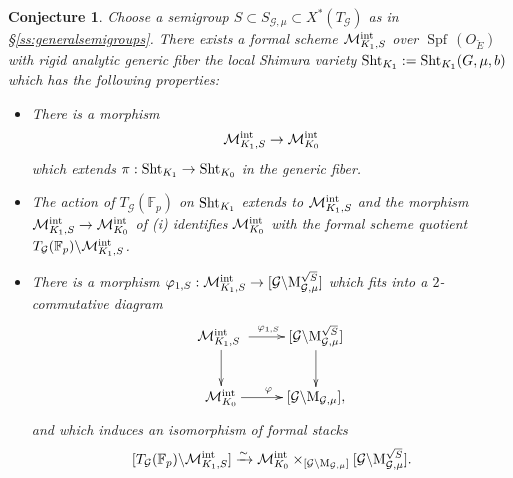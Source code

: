 \documentclass[reqno, 10pt]{amsart}
\makeatletter
\newcommand{\BF}{\ensuremath{\mathbb {F}}\xspace}
\newcommand{\CG}{\ensuremath{\mathcal {G}}\xspace}
\newcommand{\CM}{\ensuremath{\mathcal {M}}\xspace}
\DeclareMathOperator{\Spf}{Spf\,}
\newcommand{\bs}{\backslash}
\newtheorem {conjecture}[subsubsection]{Conjecture}
\theoremstyle{definition}
\numberwithin{equation}{subsection}
\numberwithin{subsubsection}{subsection}
\renewcommand{\to}{%
   \ifbool{@display}{\longrightarrow}{\rightarrow}%
   }
\newcommand{\br}{\breve}
\newcommand{\Mloc}{{\rm M}}
\makeatother
\begin{document}
\begin{conjecture}\label{localconj} Choose a semigroup $S\subset S_{\CG,\mu}\subset X^*(T_\CG)$ as in \S \ref{ss:generalsemigroups}.  
 There exists a formal scheme $\CM^{\rm int}_{K_1, S}$ over $\Spf(O_{\br E})$ with rigid analytic generic fiber  the local Shimura variety 
 ${\rm Sht}_{K_1}:={\rm Sht}_{K_1}(G,\mu, b)$ which has the following properties:
 
 \begin{itemize}
\item[i)] There is a morphism 
\[
\CM^{\rm int}_{K_1, S}\to \mathcal \CM^{\rm int}_{K_0}
\] 
which extends $\pi: {\rm Sht}_{K_1} \to {\rm Sht}_{K_0} $ in the generic fiber.
 
 \item[ii)] The action of $T_\CG(\BF_p)$ on ${\rm Sht}_{K_1}$ extends to $\CM^{\rm int}_{K_1, S}$ and the morphism 
 $\CM^{\rm int}_{K_1, S}\to \mathcal \CM^{\rm int}_{K_0}$ of (i)
  identifies $\CM^{\rm int}_{K_0}$ with the formal scheme quotient $T_\CG(\BF_p)\bs \CM^{\rm int}_{K_1, S}$.
 
 
  
  \item[iii)] There is a morphism $\varphi_{1, S}: \CM^{\rm int}_{K_1, S}\to [\CG\bs \Mloc^{\sqrt{S}}_{\CG,\mu}]$ which fits  into a $2$-commutative diagram
  \begin{equation}\label{CDlocalconj}
\begin{aligned}
 \xymatrix{
     \CM^{\rm int}_{K_1, S}\ \ar[r]^{\varphi_{1,S}} \ar[d]  &  [\CG\bs \Mloc^{\sqrt{S}}_{\CG,\mu}] \ar[d] \\
       \CM^{\rm int}_{K_0}\ar[r]^{\varphi}  & [\CG\bs \Mloc_{\CG,\mu}],
        }
        \end{aligned}
\end{equation}
 and which induces
   an isomorphism of formal stacks 
 \[
 [T_\CG(\BF_p)\bs \CM^{\rm int}_{K_1, S}]\xrightarrow{\sim}  \CM^{\rm int}_{K_0}\times_{[\CG\bs \Mloc_{\CG,\mu}]}[\CG\bs \Mloc^{\sqrt{S}}_{\CG,\mu}].
 \]
 \end{itemize}
 \end{conjecture}
 
 
\end{document}
